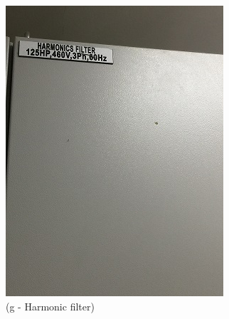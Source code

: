\begin{figure}
\begin{minipage}[b]{0.22\linewidth}
		\includegraphics[width=\textwidth]{figures/R1P_visual/harmonicsfilter}
		\caption*{(g - Harmonic filter)}
	\end{minipage}
	\hspace{0.03cm}
\begin{minipage}[b]{0.22\linewidth}

\end{minipage}
\end{figure}
